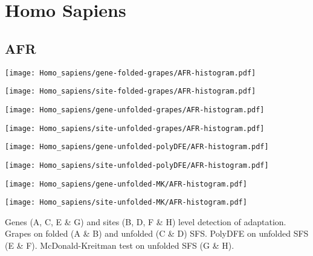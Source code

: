 \documentclass{article}
\begin{document}
\pagebreak
\section{Homo Sapiens}

\subsection{AFR}
\centering
\begin{minipage}{0.49\linewidth}
    \texttt{[image: Homo\_sapiens/gene-folded-grapes/AFR-histogram.pdf]}
\end{minipage}%
\hfill
\begin{minipage}{0.49\linewidth}
    \texttt{[image: Homo\_sapiens/site-folded-grapes/AFR-histogram.pdf]}
\end{minipage}
\hfill
\begin{minipage}{0.49\linewidth}
    \texttt{[image: Homo\_sapiens/gene-unfolded-grapes/AFR-histogram.pdf]}
\end{minipage}%
\hfill
\begin{minipage}{0.49\linewidth}
    \texttt{[image: Homo\_sapiens/site-unfolded-grapes/AFR-histogram.pdf]}
\end{minipage}
\hfill
\begin{minipage}{0.49\linewidth}
    \texttt{[image: Homo\_sapiens/gene-unfolded-polyDFE/AFR-histogram.pdf]}
\end{minipage}%
\hfill
\begin{minipage}{0.49\linewidth}
    \texttt{[image: Homo\_sapiens/site-unfolded-polyDFE/AFR-histogram.pdf]}
\end{minipage}
\hfill
\begin{minipage}{0.49\linewidth}
    \texttt{[image: Homo\_sapiens/gene-unfolded-MK/AFR-histogram.pdf]}
\end{minipage}%
\hfill
\begin{minipage}{0.49\linewidth}
    \texttt{[image: Homo\_sapiens/site-unfolded-MK/AFR-histogram.pdf]}
\end{minipage}
\hfill
\flushleft
Genes (A, C, E \& G) and sites (B, D, F \& H) level detection of adaptation.
Grapes on folded (A \& B) and unfolded (C \& D) SFS.
PolyDFE on unfolded SFS (E \& F).
McDonald-Kreitman test on unfolded SFS (G \& H).
\end{document}
